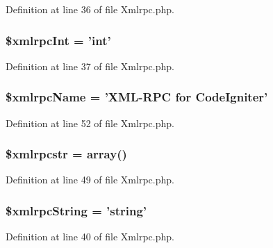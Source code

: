 Definition at line 36 of file Xmlrpc.\-php.

\subsubsection[{\$xmlrpc\-Int}]{\setlength{\rightskip}{0pt plus 5cm}\$xmlrpc\-Int = '{\bf int}'}\label{class_c_i___xmlrpc_a1bf451bf41226cf1702f54fa46b041f2}


Definition at line 37 of file Xmlrpc.\-php.

\subsubsection[{\$xmlrpc\-Name}]{\setlength{\rightskip}{0pt plus 5cm}\$xmlrpc\-Name = 'X\-M\-L-\/R\-P\-C {\bf for} Code\-Igniter'}\label{class_c_i___xmlrpc_a1311a8891b845bf89b1bc459d54a6312}


Definition at line 52 of file Xmlrpc.\-php.

\subsubsection[{\$xmlrpcstr}]{\setlength{\rightskip}{0pt plus 5cm}\$xmlrpcstr = array()}\label{class_c_i___xmlrpc_a89bbdd6a565dd3af2378b44fc5f156a0}


Definition at line 49 of file Xmlrpc.\-php.

\subsubsection[{\$xmlrpc\-String}]{\setlength{\rightskip}{0pt plus 5cm}\$xmlrpc\-String = 'string'}\label{class_c_i___xmlrpc_a69f8b2c87014597d1f5509ec934ceeea}


Definition at line 40 of file Xmlrpc.\-php.

